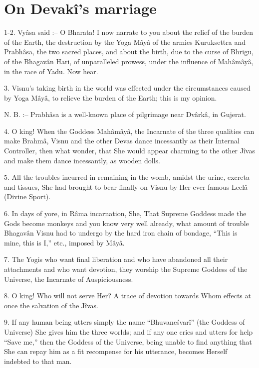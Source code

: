 ﻿\chapter{On Devak\^i's marriage}

1-2. Vy\^asa said :-- O Bharata! I now narrate to you about the relief of the burden of the Earth, the destruction by the Yoga M\^ay\^a of the armies Kuruksettra and Prabh\^asa, the two sacred places, and about the birth, due to the curse of Bhrigu, of the Bhagav\^an Hari, of unparalleled prowess, under the influence of Mah\^am\^ay\^a, in the race of Yadu. Now hear.

3. Visnu's taking birth in the world was effected under the circumstances caused by Yoga M\^ay\^a, to relieve the burden of the Earth; this is my opinion.

N. B. :-- Prabh\^asa is a well-known place of pilgrimage near Dv\^ark\^a, in Gujerat.

4. O king! When the Goddess Mah\^am\^ay\^a, the Incarnate of the three qualities can make Brahm\^a, Visnu and the other Devas dance incessantly as their Internal Controller, then what wonder, that She would appear charming to the other J\^ivas and make them dance incessantly, as wooden dolls.

5. All the troubles incurred in remaining in the womb, amidst the urine, excreta and tissues, She had brought to bear finally on Visnu by Her ever famous Leel\^a (Divine Sport).

6. In days of yore, in R\^ama incarnation, She, That Supreme Goddess made the Gods become monkeys and you know very well already, what amount of trouble Bhagav\^an Visnu had to undergo by the hard iron chain of bondage, ``This is mine, this is I,'' etc., imposed by M\^ay\^a.

7. The Yogis who want final liberation and who have abandoned all their attachments and who want devotion, they worship the Supreme Goddess of the Universe, the Incarnate of Auspiciousness.

8. O king! Who will not serve Her? A trace of devotion towards Whom effects at once the salvation of the J\^ivas.

9. If any human being utters simply the name ``Bhuvane\'svar\^i'' (the Goddess of Universe) She gives him the three worlds; and if any one cries and utters for help ``Save me,'' then the Goddess of the Universe, being unable to find anything that She can repay him as a fit recompense for his utterance, becomes Herself indebted to that man.

